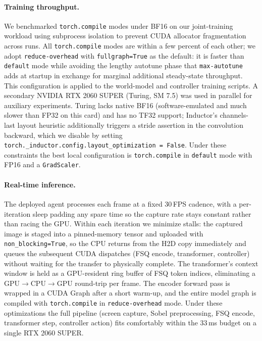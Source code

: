 \documentclass{article}
\begin{document}
\paragraph{Training throughput.}
We benchmarked \texttt{torch.compile} modes under BF16 on our joint-training workload using subprocess isolation to prevent CUDA allocator fragmentation across runs.
All \texttt{torch.compile} modes are within a few percent of each other; we adopt \texttt{reduce-overhead} with \texttt{fullgraph=True} as the default: it is faster than \texttt{default} mode while avoiding the lengthy autotune phase that \texttt{max-autotune} adds at startup in exchange for marginal additional steady-state throughput.
This configuration is applied to the world-model and controller training scripts.
A secondary NVIDIA RTX 2060 SUPER (Turing, SM 7.5) was used in parallel for auxiliary experiments.
Turing lacks native BF16 (software-emulated and much slower than FP32 on this card) and has no TF32 support; Inductor's channels-last layout heuristic additionally triggers a stride assertion in the convolution backward, which we disable by setting \texttt{torch.\_inductor.config.layout\_optimization = False}.
Under these constraints the best local configuration is \texttt{torch.compile} in \texttt{default} mode with FP16 and a \texttt{GradScaler}.

\paragraph{Real-time inference.}
The deployed agent processes each frame at a fixed 30\,FPS cadence, with a per-iteration sleep padding any spare time so the capture rate stays constant rather than racing the GPU.
Within each iteration we minimize stalls: the captured image is staged into a pinned-memory tensor and uploaded with \texttt{non\_blocking=True}, so the CPU returns from the H2D copy immediately and queues the subsequent CUDA dispatches (FSQ encode, transformer, controller) without waiting for the transfer to physically complete.
The transformer's context window is held as a GPU-resident ring buffer of FSQ token indices, eliminating a GPU$\to$CPU$\to$GPU round-trip per frame.
The encoder forward pass is wrapped in a CUDA Graph after a short warm-up, and the entire model graph is compiled with \texttt{torch.compile} in \texttt{reduce-overhead} mode.
Under these optimizations the full pipeline (screen capture, Sobel preprocessing, FSQ encode, transformer step, controller action) fits comfortably within the 33\,ms budget on a single RTX 2060 SUPER.
\end{document}
